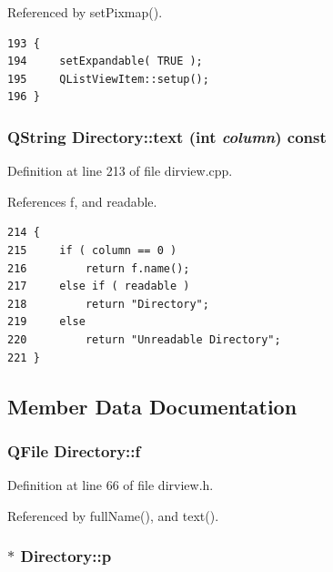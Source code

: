 Referenced by set\-Pixmap().



\footnotesize\begin{verbatim}193 {
194     setExpandable( TRUE );
195     QListViewItem::setup();
196 }
\end{verbatim}\normalsize 
{}
\subsubsection{\setlength{\rightskip}{0pt plus 5cm}QString Directory::text (int {\em column}) const}\label{classDirectory_Directorya3}




Definition at line 213 of file dirview.cpp.

References f, and readable.



\footnotesize\begin{verbatim}214 {
215     if ( column == 0 )
216         return f.name();
217     else if ( readable )
218         return "Directory";
219     else
220         return "Unreadable Directory";
221 }
\end{verbatim}\normalsize 


\subsection{Member Data Documentation}
\subsubsection{\setlength{\rightskip}{0pt plus 5cm}QFile {\bf Directory::f}\hspace{0.3cm}{\tt  [private]}}\label{classDirectory_Directoryr0}




Definition at line 66 of file dirview.h.

Referenced by full\-Name(), and text().
\subsubsection{$\ast$ {\bf Directory::p}\hspace{0.3cm}{\tt  [private]}}\label{classDirectory_Directoryr1}




